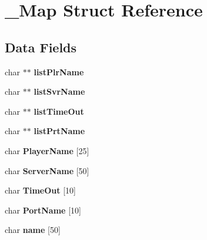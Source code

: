 \hypertarget{struct___map}{}\section{\+\_\+\+Map Struct Reference}
\label{struct___map}
\subsection*{Data Fields}
\begin{DoxyCompactItemize}
\item 
char $\ast$$\ast$ {\bfseries list\+Plr\+Name}\hypertarget{struct___map_ade5703e4636c30db184056e412bbad9f}{}\label{struct___map_ade5703e4636c30db184056e412bbad9f}

\item 
char $\ast$$\ast$ {\bfseries list\+Svr\+Name}\hypertarget{struct___map_a8cf857386077284b154dda055543b3b8}{}\label{struct___map_a8cf857386077284b154dda055543b3b8}

\item 
char $\ast$$\ast$ {\bfseries list\+Time\+Out}\hypertarget{struct___map_a2fd94d11f33e862deebb3b7d667ba636}{}\label{struct___map_a2fd94d11f33e862deebb3b7d667ba636}

\item 
char $\ast$$\ast$ {\bfseries list\+Prt\+Name}\hypertarget{struct___map_a45b86bccc4b981236f1c4a63f08ae81e}{}\label{struct___map_a45b86bccc4b981236f1c4a63f08ae81e}

\item 
char {\bfseries Player\+Name} \mbox{[}25\mbox{]}\hypertarget{struct___map_a612b2a0ee041233958a9ef2896741004}{}\label{struct___map_a612b2a0ee041233958a9ef2896741004}

\item 
char {\bfseries Server\+Name} \mbox{[}50\mbox{]}\hypertarget{struct___map_a8688ed54a60069cc4615ee29c9c6c552}{}\label{struct___map_a8688ed54a60069cc4615ee29c9c6c552}

\item 
char {\bfseries Time\+Out} \mbox{[}10\mbox{]}\hypertarget{struct___map_ab1aeb27b976555390e2429e283a877b7}{}\label{struct___map_ab1aeb27b976555390e2429e283a877b7}

\item 
char {\bfseries Port\+Name} \mbox{[}10\mbox{]}\hypertarget{struct___map_a92a954e5ff7b84046e76bd7c9a54138b}{}\label{struct___map_a92a954e5ff7b84046e76bd7c9a54138b}

\item 
char {\bfseries name} \mbox{[}50\mbox{]}\hypertarget{struct___map_ae5cb967283dbbdf75cb2032c1fa08fee}{}\label{struct___map_ae5cb967283dbbdf75cb2032c1fa08fee}


\end{DoxyCompactItemize}
